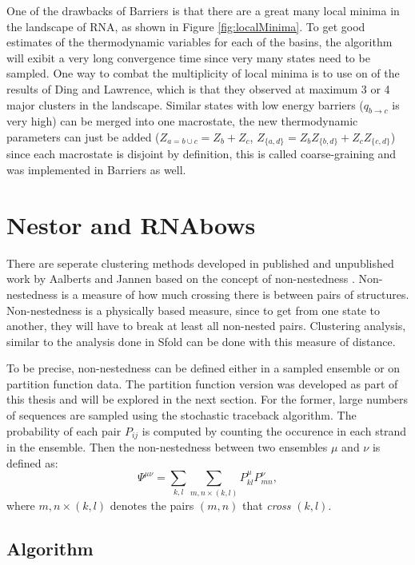 One of the drawbacks of Barriers is that there are a great many local
minima in the landscape of RNA, as shown in Figure
\ref{fig:localMinima}. To get good estimates of the thermodynamic
variables for each of the basins, the algorithm will exibit a very
long convergence time since very many states need to be sampled. One
way to combat the multiplicity of local minima is to use on of the
results of Ding and Lawrence, which is that they observed at maximum 3
or 4 major clusters in the landscape. Similar states with low energy
barriers ($q_{b \to c}$ is very high) can be merged into one
macrostate, the new thermodynamic parameters can just be added
($Z_{a=b\cup c}=Z_b+Z_c$, $Z_{\{a,d\}}=Z_bZ_{\{b,d\}}+Z_cZ_{\{c,d\}}$)
since each macrostate is disjoint by definition, this is called
coarse-graining and was implemented in Barriers as well.

\section{Nestor and RNAbows}

There are seperate clustering methods developed in published and
unpublished work by Aalberts and Jannen based on the concept of
non-nestedness \cite{aalberts2013visualizing}
\cite{aalbertsNestor}. Non-nestedness is a measure of how much
crossing there is between pairs of structures. Non-nestedness is a
physically based measure, since to get from one state to another, they
will have to break at least all non-nested pairs. Clustering analysis, similar to
the analysis done in Sfold can be done with this measure of distance.

To be precise, non-nestedness can be defined either in a sampled
ensemble or on partition function data. The partition function version
was developed as part of this thesis and will be explored in the next
section. For the former, large numbers of sequences are sampled using
the stochastic traceback algorithm. The probability of each pair
$P_{ij}$ is computed by counting the occurence in each strand in the
ensemble. Then the non-nestedness between two ensembles $\mu$ and
$\nu$ is defined as:
\begin{equation}
\Psi^{\mu\nu} = \sum_{k,l} \sum_{m,n \times (k,l)} P^{\mu}_{kl}
P^{\nu}_{mn},
\end{equation}
where $m,n \times (k,l)$ denotes the pairs $(m,n)$ that \emph{cross}
$(k,l)$. 

\subsection{Algorithm}

